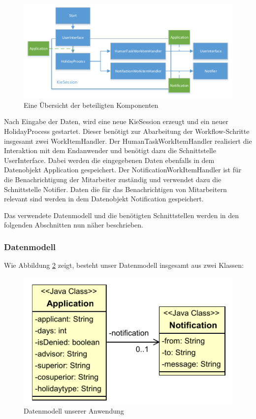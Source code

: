 \begin{figure}[H]
\centering
\includegraphics[width=1.0\linewidth]{Bilder/Komponenten}
\caption{Eine Übersicht der beteiligten Komponenten}
\label{fig:Komponenten}
\end{figure}

Nach Eingabe der Daten, wird eine neue KieSession erzeugt und ein neuer HolidayProcess gestartet. Dieser benötigt zur Abarbeitung der Workflow-Schritte insgesamt zwei WorkItemHandler. Der HumanTaskWorkItemHandler realisiert die Interaktion mit dem Endanwender und benötigt dazu die Schnittstelle UserInterface. Dabei werden die eingegebenen Daten ebenfalls in dem Datenobjekt Application gespeichert. Der NotificationWorkItemHandler ist für die Benachrichtigung der Mitarbeiter zuständig und verwendet dazu die Schnittstelle Notifier. Daten die für das Benachrichtigen von Mitarbeitern relevant sind werden in dem Datenobjekt Notification gespeichert.

Das verwendete Datenmodell und die benötigten Schnittstellen werden in den folgenden Abschnitten nun näher beschrieben.

\subsubsection{Datenmodell}
Wie Abbildung \ref{fig:Datenmodell} zeigt, besteht unser Datenmodell insgesamt aus zwei Klassen:

\begin{figure}[H]
\centering
\includegraphics[width=0.5\linewidth]{Bilder/Datenmodell}
\caption{Datenmodell unserer Anwendung}
\label{fig:Datenmodell}
\end{figure}

